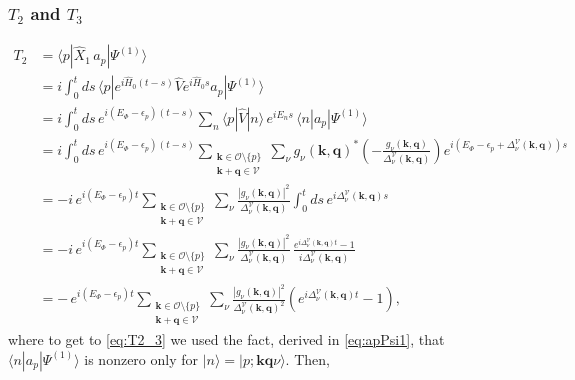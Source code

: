 \subsubsection{$T_2$ and $T_3$}
\begin{align}
T_2&=\langle p|\hat X_1\,a_p|\Psi^{(1)}\rangle\\%
&=i\int_0^t\!ds\,\langle p|e^{i\hat H_0(t-s)}\hat V e^{i\hat H_0s}a_p|\Psi^{(1)}\rangle\\
&=i\int_0^t\!ds\,e^{i(E_\Phi-\epsilon_p)(t-s)}\sum_n\langle p|\hat V|n\rangle\,e^{iE_ns}\,\langle n|a_p|\Psi^{(1)}\rangle \\ \label{eq:T2_3}
&=i\int_0^t\!ds\,e^{i(E_\Phi-\epsilon_p)(t-s)}
\sum_{\substack{\bm k\in\mathcal O\setminus\{p\}\\ \bm k+\bm q\in\mathcal V}}\sum_\nu
g_\nu(\bm k,\bm q)^*\left(-\frac{g_\nu(\bm k,\bm q)}{\Delta^{\mathcal V}_\nu(\bm k,\bm q)}\right)
e^{i\left(E_\Phi-\epsilon_p+\Delta^{\mathcal V}_\nu(\bm k,\bm q)\right)s}\\
&=-i\,e^{i(E_\Phi-\epsilon_p)t}\sum_{\substack{\bm k\in\mathcal O\setminus\{p\}\\ \bm k+\bm q\in\mathcal V}}\sum_\nu
\frac{|g_\nu(\bm k,\bm q)|^2}{\Delta^{\mathcal V}_\nu(\bm k,\bm q)}\int_0^t\!ds\,e^{i\Delta^{\mathcal V}_\nu(\bm k,\bm q)s}\\
&=-i\,e^{i(E_\Phi-\epsilon_p)t}\sum_{\substack{\bm k\in\mathcal O\setminus\{p\}\\ \bm k+\bm q\in\mathcal V}}\sum_\nu
\frac{|g_\nu(\bm k,\bm q)|^2}{\Delta^{\mathcal V}_\nu(\bm k,\bm q)}\,
\frac{e^{i\Delta^{\mathcal V}_\nu(\bm k,\bm q)t}-1}{i\Delta^{\mathcal V}_\nu(\bm k,\bm q)}\\
&=-\,e^{i(E_\Phi-\epsilon_p)t}\sum_{\substack{\bm k\in\mathcal O\setminus\{p\}\\ \bm k+\bm q\in\mathcal V}}\sum_\nu
\frac{|g_\nu(\bm k,\bm q)|^2}{\Delta^{\mathcal V}_\nu(\bm k,\bm q)^2}\left(e^{i\Delta^{\mathcal V}_\nu(\bm k,\bm q)t}-1\right), 
\end{align}
where to get to \ref{eq:T2_3} we used the fact, derived in \ref{eq:apPsi1}, that $\langle n|a_p|\Psi^{(1)}\rangle$ is nonzero only for $|n\rangle=|p;\bm k\bm q\nu\rangle$. Then, 
